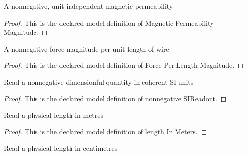 \begin{definition}
  \label{def:physics:phyx-mini-0965:phyxminiproblems-problemphyxmini0965-magneticpermeabilitymagnitude}
  A nonnegative, unit-independent magnetic permeability
\end{definition}
\begin{proof}
  This is the declared model definition of Magnetic Permeability Magnitude.
\end{proof}
\begin{definition}
  \label{def:physics:phyx-mini-0965:phyxminiproblems-problemphyxmini0965-forceperlengthmagnitude}
  A nonnegative force magnitude per unit length of wire
\end{definition}
\begin{proof}
  This is the declared model definition of Force Per Length Magnitude.
\end{proof}
\begin{definition}
  \label{def:physics:phyx-mini-0965:phyxminiproblems-problemphyxmini0965-nonnegativesireadout}
  Read a nonnegative dimensionful quantity in coherent SI units
\end{definition}
\begin{proof}
  This is the declared model definition of nonnegative SIReadout.
\end{proof}
\begin{definition}
  \label{def:physics:phyx-mini-0965:phyxminiproblems-problemphyxmini0965-lengthinmeters}
  Read a physical length in metres
\end{definition}
\begin{proof}
  This is the declared model definition of length In Meters.
\end{proof}
\begin{definition}
  \label{def:physics:phyx-mini-0965:phyxminiproblems-problemphyxmini0965-lengthincentimeters}
  Read a physical length in centimetres
\end{definition}
